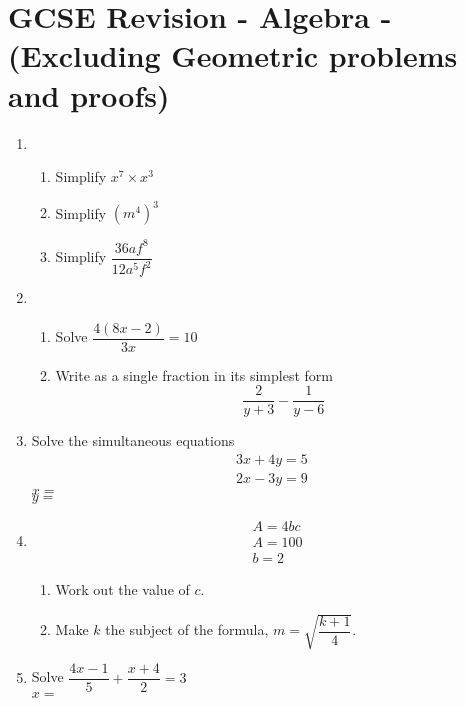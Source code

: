 
\chapter{GCSE Revision - Algebra - (Excluding Geometric problems and proofs)}
\begin{enumerate}
  \item
  \begin{enumerate}
    \item Simplify $x^7 \times x^3$\strch
    \item Simplify $(m^4)^3$\strch
    \item Simplify $\dfrac{36af^8}{12a^5f^2}$\strch\\ \vspace*{0pt}
  \end{enumerate}
  \pagebreak
  \item %
  \begin{enumerate}
    \item Solve $\dfrac{4(8x - 2)}{3x} = 10$\strch
    \item Write as a single fraction in its simplest form
    $$
    \frac{2}{y + 3} - \frac{1}{y - 6}
    $$
    \strch
  \end{enumerate}
  \item Solve the simultaneous equations
  \begin{align*}
    3x + 4y = 5\\
    2x - 3y = 9
  \end{align*}
  \hfill$x =\ $\dline\\
  \vspace*{0pt}\hfill$y =\ $\dline\\
  \vspace*{0pt}
  \strch
  \item %
  \begin{align*}
    &A = 4bc\\
    &A = 100\\
    &b = 2
  \end{align*}
  \begin{enumerate}
    \item Work out the value of $c$.\strch\newpage
    \item Make $k$ the subject of the formula, $m = \sqrt{\dfrac{k+1}{4}}$.\strch
  \end{enumerate}
  \item Solve $\dfrac{4x - 1}{5} + \dfrac{x + 4}{2} = 3$\strch\\
  \vspace*{0cm}\hfill$x =\ $\dline

\end{enumerate}
